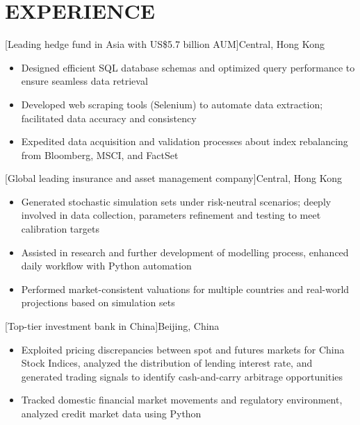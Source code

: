 \documentclass[cmu]{resume}
\begin{document}
    \section{EXPERIENCE}
    [Leading hedge fund in Asia with US\$5.7 billion AUM]{Central, Hong Kong}
    \begin{itemize}
        \item Designed efficient SQL database schemas and optimized query performance to ensure seamless data retrieval
        \item Developed web scraping tools (Selenium) to automate data extraction; facilitated data accuracy and consistency
        \item Expedited data acquisition and validation processes about index rebalancing from Bloomberg, MSCI, and FactSet
    \end{itemize}

    [Global leading insurance and asset management company]{Central, Hong Kong}
    \begin{itemize}
        \item Generated stochastic simulation sets under risk-neutral scenarios; deeply involved in data collection, parameters refinement and testing to meet calibration targets
        \item Assisted in research and further development of modelling process, enhanced daily workflow with Python automation
        \item Performed market-consistent valuations for multiple countries and real-world projections based on simulation sets
    \end{itemize}

    [Top-tier investment bank in China]{Beijing, China}
    \begin{itemize}
        \item Exploited pricing discrepancies between spot and futures markets for China Stock Indices, analyzed the distribution of lending interest rate, and generated trading signals to identify cash-and-carry arbitrage opportunities
        \item Tracked domestic financial market movements and regulatory environment, analyzed credit market data using Python
    \end{itemize}
\end{document}
